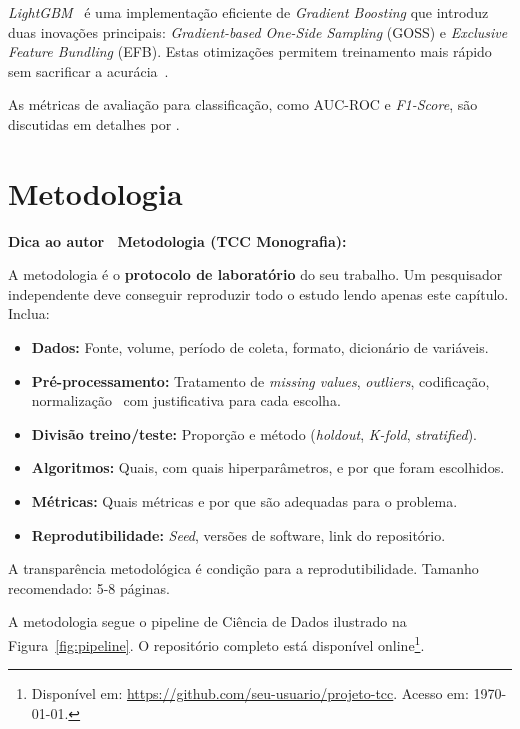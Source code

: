 \documentclass[
    12pt,
    oneside,
    a4paper,
    english,
    brazilian
    ]{abntex2}
\numberwithin{equation}{chapter}
\newenvironment{dica}{%
    \par\medskip
    \color{blue!60!black}\small\itshape
}{%
    \par\medskip
}
\begin{document}
\textit{LightGBM}~\cite{ke2017lightgbm} é uma implementação eficiente de \textit{Gradient Boosting} que introduz duas inovações principais: \textit{Gradient-based One-Side Sampling} (GOSS) e \textit{Exclusive Feature Bundling} (EFB). Estas otimizações permitem treinamento mais rápido sem sacrificar a acurácia~\cite{geron2022}.

As métricas de avaliação para classificação, como AUC-ROC e \textit{F1-Score}, são discutidas em detalhes por .

\chapter{Metodologia}\label{cap:metodologia}

\begin{dica}
\noindent\textbf{Dica ao autor \textemdash\ Metodologia (TCC Monografia):}

A metodologia é o \textbf{protocolo de laboratório} do seu trabalho. Um pesquisador independente deve conseguir reproduzir todo o estudo lendo apenas este capítulo. Inclua:
\begin{itemize}
    \item \textbf{Dados:} Fonte, volume, período de coleta, formato, dicionário de variáveis.
    \item \textbf{Pré-processamento:} Tratamento de \textit{missing values}, \textit{outliers}, codificação, normalização \textemdash\ com justificativa para cada escolha.
    \item \textbf{Divisão treino/teste:} Proporção e método (\textit{holdout}, \textit{K-fold}, \textit{stratified}).
    \item \textbf{Algoritmos:} Quais, com quais hiperparâmetros, e por que foram escolhidos.
    \item \textbf{Métricas:} Quais métricas e por que são adequadas para o problema.
    \item \textbf{Reprodutibilidade:} \textit{Seed}, versões de software, link do repositório.
\end{itemize}
A transparência metodológica é condição para a reprodutibilidade. Tamanho recomendado: 5-8 páginas.
\end{dica}

A metodologia segue o pipeline de Ciência de Dados ilustrado na Figura~\ref{fig:pipeline}. O repositório completo está disponível online\footnote{Disponível em: \url{https://github.com/seu-usuario/projeto-tcc}. Acesso em: \today.}.
\end{document}
